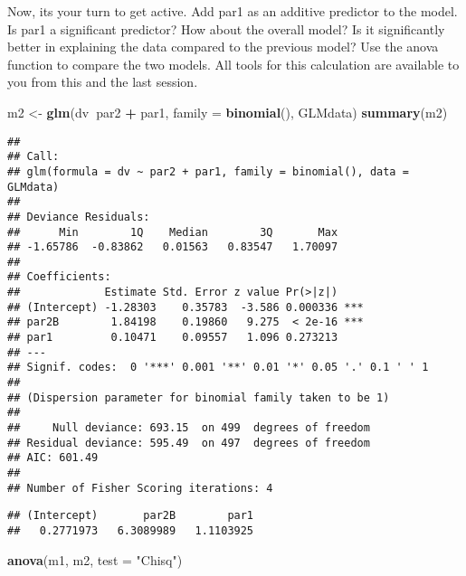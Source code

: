 \documentclass[
]{article}
\newenvironment{Shaded}{\begin{snugshade}}{\end{snugshade}}
\newcommand{\DataTypeTok}[1]{\textcolor[rgb]{0.13,0.29,0.53}{#1}}
\newcommand{\KeywordTok}[1]{\textcolor[rgb]{0.13,0.29,0.53}{\textbf{#1}}}
\newcommand{\NormalTok}[1]{#1}
\newcommand{\OperatorTok}[1]{\textcolor[rgb]{0.81,0.36,0.00}{\textbf{#1}}}
\newcommand{\StringTok}[1]{\textcolor[rgb]{0.31,0.60,0.02}{#1}}
\begin{document}
Now, its your turn to get active. Add par1 as an additive predictor to
the model. Is par1 a significant predictor? How about the overall model?
Is it significantly better in explaining the data compared to the
previous model? Use the anova function to compare the two models. All
tools for this calculation are available to you from this and the last
session.

\begin{Shaded}
\begin{Highlighting}[]
\NormalTok{m2 <-}\StringTok{ }\KeywordTok{glm}\NormalTok{(dv}\OperatorTok{~}\NormalTok{par2 }\OperatorTok{+}\StringTok{ }\NormalTok{par1,}
          \DataTypeTok{family =} \KeywordTok{binomial}\NormalTok{(), GLMdata)}
\KeywordTok{summary}\NormalTok{(m2)}
\end{Highlighting}
\end{Shaded}

\begin{verbatim}
## 
## Call:
## glm(formula = dv ~ par2 + par1, family = binomial(), data = GLMdata)
## 
## Deviance Residuals: 
##      Min        1Q    Median        3Q       Max  
## -1.65786  -0.83862   0.01563   0.83547   1.70097  
## 
## Coefficients:
##             Estimate Std. Error z value Pr(>|z|)    
## (Intercept) -1.28303    0.35783  -3.586 0.000336 ***
## par2B        1.84198    0.19860   9.275  < 2e-16 ***
## par1         0.10471    0.09557   1.096 0.273213    
## ---
## Signif. codes:  0 '***' 0.001 '**' 0.01 '*' 0.05 '.' 0.1 ' ' 1
## 
## (Dispersion parameter for binomial family taken to be 1)
## 
##     Null deviance: 693.15  on 499  degrees of freedom
## Residual deviance: 595.49  on 497  degrees of freedom
## AIC: 601.49
## 
## Number of Fisher Scoring iterations: 4
\end{verbatim}

\begin{Shaded}
\end{Shaded}

\begin{verbatim}
## (Intercept)       par2B        par1 
##   0.2771973   6.3089989   1.1103925
\end{verbatim}

\begin{Shaded}
\begin{Highlighting}[]
\KeywordTok{anova}\NormalTok{(m1, m2, }\DataTypeTok{test =} \StringTok{"Chisq"}\NormalTok{)}
\end{Highlighting}
\end{Shaded}
\end{document}
